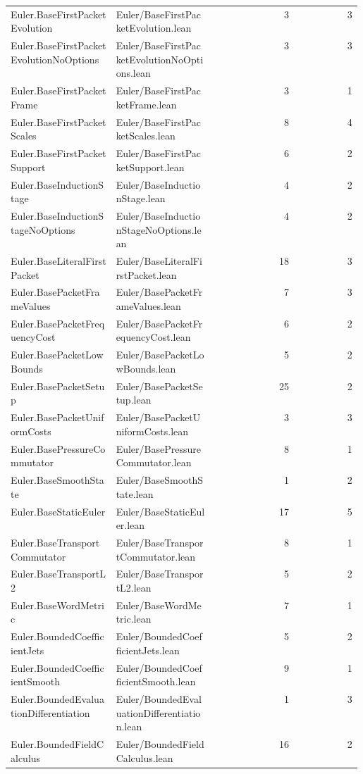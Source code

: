 \begin{longtable}{p{0.30\linewidth}p{0.28\linewidth}rr}
Euler.BaseFirstPacketEvolution & Euler/BaseFirstPacketEvolution.lean & 3 & 3\\
Euler.BaseFirstPacketEvolutionNoOptions & Euler/BaseFirstPacketEvolutionNoOptions.lean & 3 & 3\\
Euler.BaseFirstPacketFrame & Euler/BaseFirstPacketFrame.lean & 3 & 1\\
Euler.BaseFirstPacketScales & Euler/BaseFirstPacketScales.lean & 8 & 4\\
Euler.BaseFirstPacketSupport & Euler/BaseFirstPacketSupport.lean & 6 & 2\\
Euler.BaseInductionStage & Euler/BaseInductionStage.lean & 4 & 2\\
Euler.BaseInductionStageNoOptions & Euler/BaseInductionStageNoOptions.lean & 4 & 2\\
Euler.BaseLiteralFirstPacket & Euler/BaseLiteralFirstPacket.lean & 18 & 3\\
Euler.BasePacketFrameValues & Euler/BasePacketFrameValues.lean & 7 & 3\\
Euler.BasePacketFrequencyCost & Euler/BasePacketFrequencyCost.lean & 6 & 2\\
Euler.BasePacketLowBounds & Euler/BasePacketLowBounds.lean & 5 & 2\\
Euler.BasePacketSetup & Euler/BasePacketSetup.lean & 25 & 2\\
Euler.BasePacketUniformCosts & Euler/BasePacketUniformCosts.lean & 3 & 3\\
Euler.BasePressureCommutator & Euler/BasePressureCommutator.lean & 8 & 1\\
Euler.BaseSmoothState & Euler/BaseSmoothState.lean & 1 & 2\\
Euler.BaseStaticEuler & Euler/BaseStaticEuler.lean & 17 & 5\\
Euler.BaseTransportCommutator & Euler/BaseTransportCommutator.lean & 8 & 1\\
Euler.BaseTransportL2 & Euler/BaseTransportL2.lean & 5 & 2\\
Euler.BaseWordMetric & Euler/BaseWordMetric.lean & 7 & 1\\
Euler.BoundedCoefficientJets & Euler/BoundedCoefficientJets.lean & 5 & 2\\
Euler.BoundedCoefficientSmooth & Euler/BoundedCoefficientSmooth.lean & 9 & 1\\
Euler.BoundedEvaluationDifferentiation & Euler/BoundedEvaluationDifferentiation.lean & 1 & 3\\
Euler.BoundedFieldCalculus & Euler/BoundedFieldCalculus.lean & 16 & 2\\

\end{longtable}
